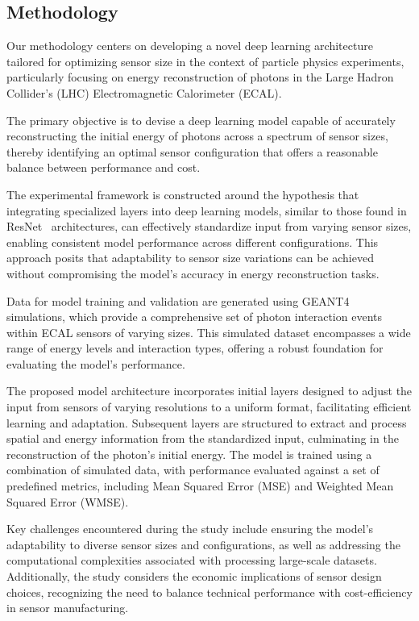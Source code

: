 \documentclass[conference]{IEEEtran}
\begin{document}
\subsection{Methodology}
\label{main_body:methodology}

Our methodology centers on developing a novel deep learning architecture tailored for optimizing sensor size in the context of particle physics experiments, particularly focusing on energy reconstruction of photons in the Large Hadron Collider's (LHC) Electromagnetic Calorimeter (ECAL).

The primary objective is to devise a deep learning model capable of accurately reconstructing the initial energy of photons across a spectrum of sensor sizes, thereby identifying an optimal sensor configuration that offers a reasonable balance between performance and cost.

The experimental framework is constructed around the hypothesis that integrating specialized layers into deep learning models, similar to those found in ResNet~\cite{he2015deep} architectures, can effectively standardize input from varying sensor sizes, enabling consistent model performance across different configurations. This approach posits that adaptability to sensor size variations can be achieved without compromising the model's accuracy in energy reconstruction tasks.

Data for model training and validation are generated using GEANT4~\cite{AGOSTINELLI2003250} simulations, which provide a comprehensive set of photon interaction events within ECAL sensors of varying sizes. This simulated dataset encompasses a wide range of energy levels and interaction types, offering a robust foundation for evaluating the model's performance.

The proposed model architecture incorporates initial layers designed to adjust the input from sensors of varying resolutions to a uniform format, facilitating efficient learning and adaptation. Subsequent layers are structured to extract and process spatial and energy information from the standardized input, culminating in the reconstruction of the photon's initial energy. The model is trained using a combination of simulated data, with performance evaluated against a set of predefined metrics, including Mean Squared Error (MSE) and Weighted Mean Squared Error (WMSE).

Key challenges encountered during the study include ensuring the model's adaptability to diverse sensor sizes and configurations, as well as addressing the computational complexities associated with processing large-scale datasets. Additionally, the study considers the economic implications of sensor design choices, recognizing the need to balance technical performance with cost-efficiency in sensor manufacturing.
\end{document}
